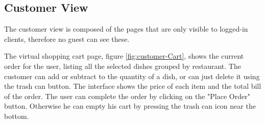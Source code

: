 \subsection{Customer View}

The customer view is composed of the pages that are only visible to logged-in clients, therefore no guest can see these.

\begin{center}
    \label{fig:customer-Cart}
\end{center}

The virtual shopping cart page, figure \ref{fig:customer-Cart}, shows the current order for the user, listing all the selected dishes grouped by restaurant. The customer can add or subtract to the quantity of a dish, or can just delete it using the trash can button. The interface shows the price of each item and the total bill of the order. The user can complete the order by clicking on the "Place Order" button. Otherwise he can empty his cart by pressing the trash can icon near the bottom.

\begin{center}
    \label{fig:customer-PreviousOrders}
\end{center}

